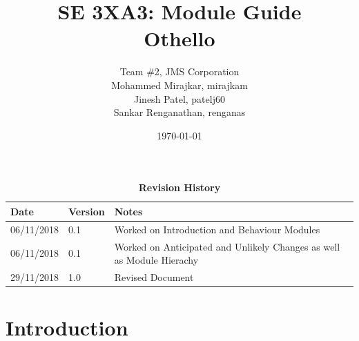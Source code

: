 \documentclass[12pt, titlepage]{article}
\title{SE 3XA3: Module Guide\\Othello}
\author{Team \#2, JMS Corporation
		\\ Mohammed Mirajkar, mirajkam
		\\ Jinesh Patel, patelj60
		\\ Sankar Renganathan, renganas
}
\date{\today}
\begin{document}
\maketitle

\tableofcontents
\listoftables
\listoffigures

\begin{table}[bp]
\caption{\bf Revision History}
\begin{tabularx}{\textwidth}{p{3cm}p{2cm}X}
\toprule {\bf Date} & {\bf Version} & {\bf Notes}\\
\midrule
06/11/2018 & 0.1 & Worked on Introduction and Behaviour Modules\\
06/11/2018 & 0.1 & Worked on Anticipated and Unlikely Changes as well as Module Hierachy\\
29/11/2018 & 1.0 & Revised Document\\
\bottomrule
\end{tabularx}
\end{table}

\newpage


\section{Introduction}
\end{document}
